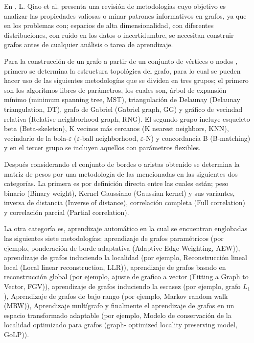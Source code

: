 
En \cite{QIAO2018336}, L. Qiao et al. presenta una revisi\'on de 
 metodolog\'ias cuyo objetivo es analizar las propiedades valiosas o minar 
 patrones informativos en grafos, ya que en los problemas con; espacios de 
 alta dimensionalidad, con diferentes distribuciones, con ruido en los 
 datos o incertidumbre, se necesitan construir grafos antes de cualquier 
 an\'alisis o tarea de aprendizaje. 


Para la construcci\'on de un grafo a partir de un conjunto de v\'ertices o 
 nodos \cite{QIAO2018336}, primero se determina la estructura topol\'ogica 
 del grafo, para lo cual se pueden hacer uso de las siguientes 
 metodolog\'ias que se dividen en tres grupos; el primero son los 
 algoritmos libres de par\'ametros, los cuales son, \'arbol de expansi\'on 
 m\'inimo (minimum spanning tree, MST), triangulaci\'on de Delaunay 
 (Delaunay triangulation, DT), grafo de Gabriel (Gabriel graph, GG) y 
 gr\'afico de vecindad relativa (Relative neighborhood graph, RNG).  El 
 segundo grupo incluye esqueleto beta (Beta-skeleton), K vecinos m\'as 
 cercanos (K nearest neighbors, KNN), vecindario de la bola-$\varepsilon$ 
 ($\varepsilon$-ball neighborhood, $\varepsilon$-N) y concordancia B 
 (B-matching) y en el tercer grupo se incluyen aquellos con par\'ametros 
 flexibles.


Despu\'es considerando el conjunto de bordes \cite{QIAO2018336} o aristas 
 obtenido se determina la matriz de pesos por una metodolog\'ia de las 
 mencionadas en las siguientes dos categor\'ias. La primera es por 
 definici\'on directa entre las cuales est\'an; peso binario (Binary 
 weight), Kernel Gaussiano (Gaussian kernel) y sus variantes, inversa de 
 distancia (Inverse of distance), correlaci\'on completa (Full correlation) 
 y correlaci\'on parcial (Partial correlation). 


La otra categor\'ia es, aprendizaje autom\'atico \cite{QIAO2018336} en la 
 cual se encuentran englobadas las siguientes siete metodolog\'ias; 
 aprendizaje de grafos param\'etricos (por ejemplo, ponderaci\'on de borde 
 adaptativa (Adaptive Edge Weighting, AEW)), aprendizaje de grafos 
 induciendo la localidad (por ejemplo, Reconstrucci\'on lineal local (Local 
 linear reconstruction, LLR)), aprendizaje de grafos basado en 
 reconstrucci\'on global (por ejemplo, ajuste de grafico a vector (Fitting 
 a Graph to Vector, FGV)), aprendizaje de grafos induciendo la escasez (por 
 ejemplo, grafo $L_1$), Aprendizaje de grafos de bajo rango (por ejemplo, 
 Markov random walk (MRW)), Aprendizaje mult\'igrafo y finalmente el 
 aprendizaje de grafos en un espacio transformado adaptable (por ejemplo, 
 Modelo de conservaci\'on de la localidad optimizado para grafos (graph-
 optimized locality preserving model, GoLP)). 

